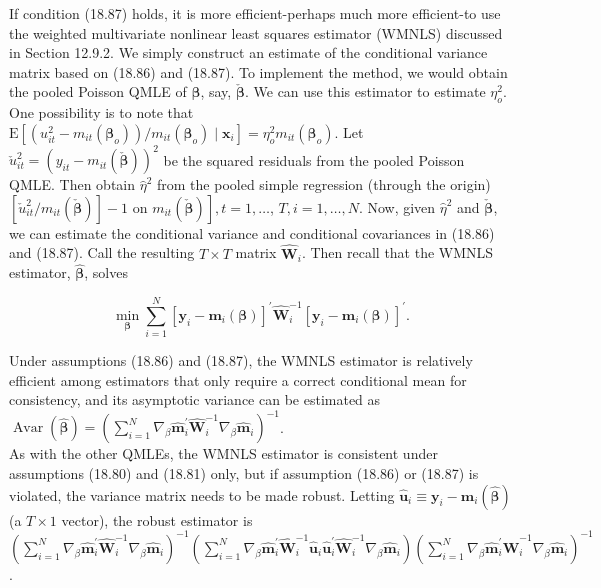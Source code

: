 \documentclass[10pt]{article}
\begin{document}
If condition (18.87) holds, it is more efficient-perhaps much more efficient-to use the weighted multivariate nonlinear least squares estimator (WMNLS) discussed in Section 12.9.2. We simply construct an estimate of the conditional variance matrix based on (18.86) and (18.87). To implement the method, we would obtain the pooled Poisson QMLE of $\boldsymbol{\beta}$, say, $\check{\boldsymbol{\beta}}$. We can use this estimator to estimate $\eta_{o}^{2}$. One possibility is to note that $\mathrm{E}\left[\left(u_{i t}^{2}-m_{i t}\left(\boldsymbol{\beta}_{o}\right)\right) / m_{i t}\left(\boldsymbol{\beta}_{o}\right) \mid \mathbf{x}_{i}\right]=\eta_{o}^{2} m_{i t}\left(\boldsymbol{\beta}_{o}\right)$. Let $\check{u}_{i t}^{2}=\left(y_{i t}-m_{i t}(\check{\boldsymbol{\beta}})\right)^{2}$ be the squared residuals from the pooled Poisson QMLE. Then obtain $\hat{\eta}^{2}$ from the pooled simple regression (through the origin) $\left[\check{u}_{i t}^{2} / m_{i t}(\check{\boldsymbol{\beta}})\right]-1$ on $\left.m_{i t}(\check{\boldsymbol{\beta}})\right], t=1, \ldots$, $T, i=1, \ldots, N$. Now, given $\hat{\eta}^{2}$ and $\check{\boldsymbol{\beta}}$, we can estimate the conditional variance and conditional covariances in (18.86) and (18.87). Call the resulting $T \times T$ matrix $\hat{\mathbf{W}}_{i}$. Then recall that the WMNLS estimator, $\hat{\boldsymbol{\beta}}$, solves

$$
\min _{\boldsymbol{\beta}} \sum_{i=1}^{N}\left[\mathbf{y}_{i}-\mathbf{m}_{i}(\boldsymbol{\beta})\right]^{\prime} \hat{\mathbf{W}}_{i}^{-1}\left[\mathbf{y}_{i}-\mathbf{m}_{i}(\boldsymbol{\beta})\right]^{\prime} .
$$

Under assumptions (18.86) and (18.87), the WMNLS estimator is relatively efficient among estimators that only require a correct conditional mean for consistency, and its asymptotic variance can be estimated as\\
$\operatorname{Avar}(\hat{\boldsymbol{\beta}})=\left(\sum_{i=1}^{N} \nabla_{\beta} \hat{\mathbf{m}}_{i}^{\prime} \hat{\mathbf{W}}_{i}^{-1} \nabla_{\beta} \hat{\mathbf{m}}_{i}\right)^{-1}$.\\
As with the other QMLEs, the WMNLS estimator is consistent under assumptions (18.80) and (18.81) only, but if assumption (18.86) or (18.87) is violated, the variance matrix needs to be made robust. Letting $\hat{\mathbf{u}}_{i} \equiv \mathbf{y}_{i}-\mathbf{m}_{i}(\hat{\boldsymbol{\beta}})$ (a $T \times 1$ vector), the robust estimator is\\
$\left(\sum_{i=1}^{N} \nabla_{\beta} \hat{\mathbf{m}}_{i}^{\prime} \hat{\mathbf{W}}_{i}^{-1} \nabla_{\beta} \hat{\mathbf{m}}_{i}\right)^{-1}\left(\sum_{i=1}^{N} \nabla_{\beta} \hat{\mathbf{m}}_{i}^{\prime} \hat{\mathbf{W}}_{i}^{-1} \hat{\mathbf{u}}_{i} \hat{\mathbf{u}}_{i}^{\prime} \hat{\mathbf{W}}_{i}^{-1} \nabla_{\beta} \hat{\mathbf{m}}_{i}\right)\left(\sum_{i=1}^{N} \nabla_{\beta} \hat{\mathbf{m}}_{i}^{\prime} \hat{\mathbf{W}}_{i}^{-1} \nabla_{\beta} \hat{\mathbf{m}}_{i}\right)^{-1}$.
\end{document}
